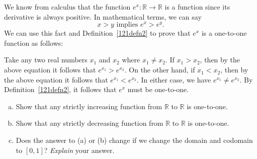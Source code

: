 \begin{example}{}  We know from calculus that the function $e^x: \mathbb{R} \rightarrow \mathbb{R}$ is a  function since its derivative is always positive.  In mathematical terms, we can say
\[ x > y \text{ implies  } e^x > e^y.\]
We can use this fact and Definition~\ref{121defn2} to prove that $e^x$  is a one-to-one function as follows:

Take any two real numbers $x_1$ and $x_2$ where $x_1 \neq x_2$. If $x_1 > x_2$, then by the above equation it follows that $e^{x_1} > e^{x_2}$. On the other hand, 
if $x_1 < x_2$, then by the above equation it follows that $e^{x_1} < e^{x_2}$.  In either case, we have  $e^{x_1} \neq e^{x_2}$. By Definition~\ref{121defn2}, it follows that $e^x$ must be one-to-one.
\end{example}

\begin{exercise}{}
\begin{enumerate}[(a)]
\item
 Show that any strictly increasing function  from $\mathbb{R}$ to $\mathbb{R}$ is one-to-one.
\item
 Show that any strictly decreasing function  from $\mathbb{R}$ to $\mathbb{R}$ is one-to-one.
\item
Does the answer to (a) or (b) change if we change the domain and codomain to $[0,1]$?  \emph{Explain} your answer.
\end{enumerate}
\end{exercise}




 


